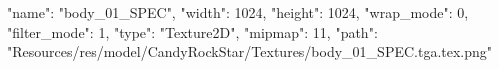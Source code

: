 {
  "name": "body_01_SPEC",
  "width": 1024,
  "height": 1024,
  "wrap_mode": 0,
  "filter_mode": 1,
  "type": "Texture2D",
  "mipmap": 11,
  "path": "Resources/res/model/CandyRockStar/Textures/body_01_SPEC.tga.tex.png"
}